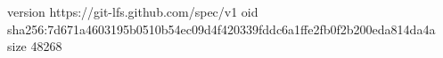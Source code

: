 version https://git-lfs.github.com/spec/v1
oid sha256:7d671a4603195b0510b54ec09d4f420339fddc6a1ffe2fb0f2b200eda814da4a
size 48268
